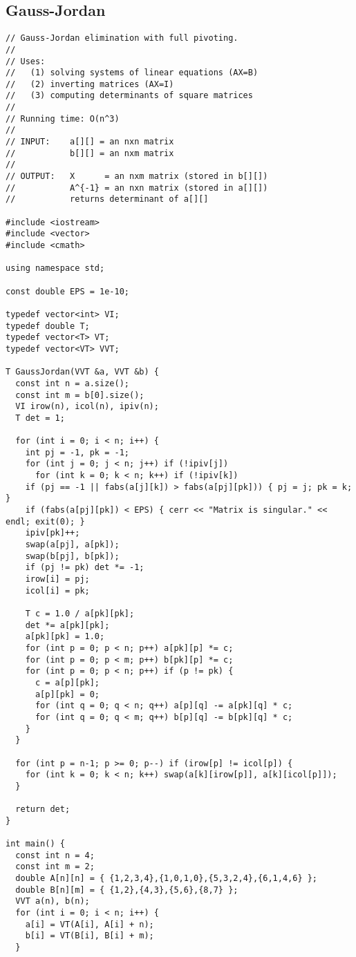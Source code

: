 \subsection{Gauss-Jordan}

\begin{lstlisting}
// Gauss-Jordan elimination with full pivoting.
//
// Uses:
//   (1) solving systems of linear equations (AX=B)
//   (2) inverting matrices (AX=I)
//   (3) computing determinants of square matrices
//
// Running time: O(n^3)
//
// INPUT:    a[][] = an nxn matrix
//           b[][] = an nxm matrix
//
// OUTPUT:   X      = an nxm matrix (stored in b[][])
//           A^{-1} = an nxn matrix (stored in a[][])
//           returns determinant of a[][]

#include <iostream>
#include <vector>
#include <cmath>

using namespace std;

const double EPS = 1e-10;

typedef vector<int> VI;
typedef double T;
typedef vector<T> VT;
typedef vector<VT> VVT;

T GaussJordan(VVT &a, VVT &b) {
  const int n = a.size();
  const int m = b[0].size();
  VI irow(n), icol(n), ipiv(n);
  T det = 1;

  for (int i = 0; i < n; i++) {
    int pj = -1, pk = -1;
    for (int j = 0; j < n; j++) if (!ipiv[j])
      for (int k = 0; k < n; k++) if (!ipiv[k])
	if (pj == -1 || fabs(a[j][k]) > fabs(a[pj][pk])) { pj = j; pk = k; }
    if (fabs(a[pj][pk]) < EPS) { cerr << "Matrix is singular." << endl; exit(0); }
    ipiv[pk]++;
    swap(a[pj], a[pk]);
    swap(b[pj], b[pk]);
    if (pj != pk) det *= -1;
    irow[i] = pj;
    icol[i] = pk;

    T c = 1.0 / a[pk][pk];
    det *= a[pk][pk];
    a[pk][pk] = 1.0;
    for (int p = 0; p < n; p++) a[pk][p] *= c;
    for (int p = 0; p < m; p++) b[pk][p] *= c;
    for (int p = 0; p < n; p++) if (p != pk) {
      c = a[p][pk];
      a[p][pk] = 0;
      for (int q = 0; q < n; q++) a[p][q] -= a[pk][q] * c;
      for (int q = 0; q < m; q++) b[p][q] -= b[pk][q] * c;      
    }
  }

  for (int p = n-1; p >= 0; p--) if (irow[p] != icol[p]) {
    for (int k = 0; k < n; k++) swap(a[k][irow[p]], a[k][icol[p]]);
  }

  return det;
}

int main() {
  const int n = 4;
  const int m = 2;
  double A[n][n] = { {1,2,3,4},{1,0,1,0},{5,3,2,4},{6,1,4,6} };
  double B[n][m] = { {1,2},{4,3},{5,6},{8,7} };
  VVT a(n), b(n);
  for (int i = 0; i < n; i++) {
    a[i] = VT(A[i], A[i] + n);
    b[i] = VT(B[i], B[i] + m);
  }
  

\end{lstlisting}
